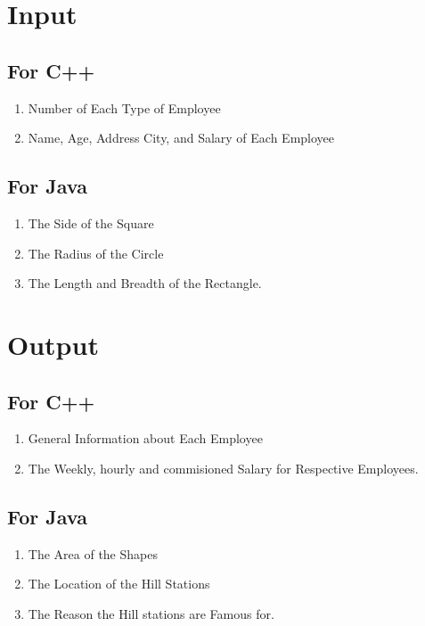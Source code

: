 \documentclass[11pt]{article}
\begin{document}
\section{Input}

\subsection*{For C++}
\begin{enumerate}
	\item Number of Each Type of Employee
	\item Name, Age, Address City, and Salary of Each Employee
\end{enumerate}

\subsection*{For Java}
\begin{enumerate}
	\item The Side of the Square
	\item The Radius of the Circle
	\item The Length and Breadth of the Rectangle. 
\end{enumerate}

\section{Output}
\subsection*{For C++}
\begin{enumerate}
	\item General Information about Each Employee
	\item The Weekly, hourly and commisioned Salary for Respective Employees. 
\end{enumerate}

\subsection*{For Java}
\begin{enumerate}
	\item The Area of the Shapes
	\item The Location of the Hill Stations
	\item The Reason the Hill stations are Famous for. 
\end{enumerate}
\end{document}
